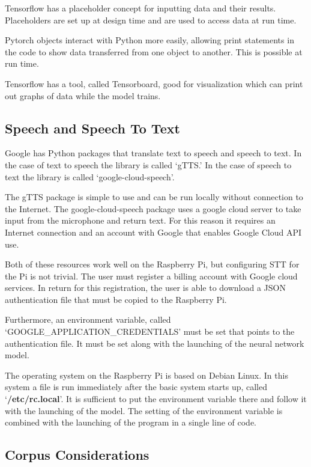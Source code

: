 Tensorflow has a placeholder concept for inputting data and their results. Placeholders are set up at design time and are used to access data at run time.

Pytorch objects interact with Python more easily, allowing print statements in the code to show data transferred from one object to another. This is possible at run time.

Tensorflow has a tool, called Tensorboard, good for visualization which can print out graphs of data while the model trains. 

\subsection{Speech and Speech To Text}

Google has Python packages that translate text to speech and speech to text. In the case of text to speech the library is called `\ac{gTTS}.' In the case of speech to text the library is called `google-cloud-speech'. 

The gTTS package is simple to use and can be run locally without connection to the Internet. The google-cloud-speech package uses a google cloud server to take input from the microphone and return text. For this reason it requires an Internet connection and an account with Google that enables Google Cloud API use. %

Both of these resources work well on the Raspberry Pi, but configuring STT for the Pi is not trivial. The user must register a billing account with Google cloud services. In return for this registration, the user is able to download a JSON authentication file that must be copied to the Raspberry Pi. 

Furthermore, an environment variable, called `GOOGLE\_APPLICATION\_CREDENTIALS' must be set that points to the authentication file. It must be set along with the launching of the neural network model.

The operating system on the Raspberry Pi is based on Debian Linux. In this system a file is run immediately after the basic system starts up, called `\textbf{/etc/rc.local}'. It is sufficient to put the environment variable there and follow it with the launching of the model. The setting of the environment variable is combined with the launching of the program in a single line of code.


\subsection{Corpus Considerations}

